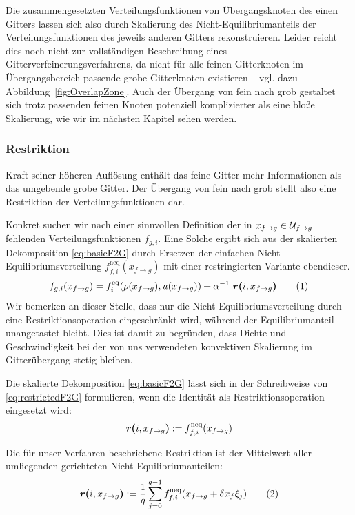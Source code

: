 Die zusammengesetzten Verteilungsfunktionen von Übergangsknoten des einen Gitters lassen sich also durch Skalierung des Nicht-Equilibriumanteils der Verteilungsfunktionen des jeweils anderen Gitters rekonstruieren. Leider reicht dies noch nicht zur vollständigen Beschreibung eines Gitterverfeinerungsverfahrens, da nicht für alle feinen Gitterknoten im Übergangsbereich passende grobe Gitterknoten existieren -- vgl. dazu Abbildung~\ref{fig:OverlapZone}. Auch der Übergang von fein nach grob gestaltet sich trotz passenden feinen Knoten potenziell komplizierter als eine bloße Skalierung, wie wir im nächsten Kapitel sehen werden.

\newpage
\subsubsection{Restriktion}

Kraft seiner höheren Auflösung enthält das feine Gitter mehr Informationen als das umgebende grobe Gitter. Der Übergang von fein nach grob stellt also eine Restriktion der Verteilungsfunktionen dar.

Konkret suchen wir nach einer sinnvollen Definition der in \(x_{f \to g} \in \mathcal{U}_{f \to g}\) fehlenden Verteilungsfunktionen \(f_{g,i}\). Eine Solche ergibt sich aus der skalierten Dekomposition \ref{eq:basicF2G} durch Ersetzen der einfachen Nicht-Equilibriumsverteilung \(f_{f,i}^\text{neq}(x_{f \to g})\) mit einer restringierten Variante ebendieser.
\[f_{g,i}(x_{f \to g}) = f_i^\text{eq}(\rho(x_{f \to g}), u(x_{f \to g})) + \alpha^{-1} \ \resarg{i}{x_{f \to g}} \numberthis\label{eq:restrictedF2G}\]
Wir bemerken an dieser Stelle, dass nur die Nicht-Equilibriumsverteilung durch eine Restriktionsoperation eingeschränkt wird, während der Equilibriumanteil unangetastet bleibt. Dies ist damit zu begründen, dass Dichte und Geschwindigkeit bei der von uns verwendeten konvektiven Skalierung im Gitterübergang stetig bleiben.

Die skalierte Dekomposition \ref{eq:basicF2G} lässt sich in der Schreibweise von \ref{eq:restrictedF2G} formulieren, wenn die Identität als Restriktionsoperation eingesetzt wird: \[\boldsymbol{r(}{i}, {x_{f \to g}}\boldsymbol{)} := f_{f,i}^\text{neq}(x_{f \to g})\]

Die für unser Verfahren \cite[Kap.~3.3]{Lagrava12} beschriebene Restriktion ist der Mittelwert aller umliegenden gerichteten Nicht-Equilibriumanteilen:
\[\resarg{i}{x_{f \to g}} := \frac{1}{q} \sum_{j=0}^{q-1} f_{f,i}^\text{neq}(x_{f \to g} + \delta x_f \xi_j) \numberthis\label{eq:neqAvgRestrictionF2G}\]

